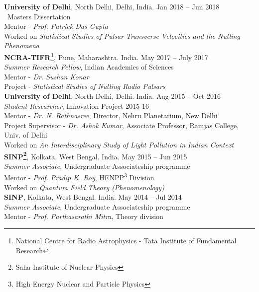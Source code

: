 {\bf University of Delhi}, North Delhi, Delhi, India. \hfill{Jan 2018 -- Jun 2018}\\
{\ Masters Dissertation}\\
Mentor - {\em Prof. Patrick Das Gupta}\\
Worked on {\em Statistical Studies of Pulsar Transverse Velocities and the Nulling Phenomena}\\

{\bf NCRA-TIFR\footnote{National Centre for Radio Astrophysics - Tata Institute of Fundamental Research}}, Pune, Maharashtra. India. \hfill{May 2017 -- July 2017}\\
{\em Summer Research Fellow}, Indian Academies of Sciences\\
Mentor - {\em Dr. Sushan Konar}\\
Project - {\em Statistical Studies of Nulling Radio Pulsars}\\

{\bf University of Delhi}, North Delhi, Delhi. India. \hfill{Aug 2015 -- Oct 2016}\\
{\em Student Researcher}, Innovation Project 2015-16\\
Mentor - {\em Dr. N. Rathnasree}, Director, Nehru Planetarium, New Delhi\\
Project Supervisor - {\em Dr. Ashok Kumar}, Associate Professor, Ramjas College, Univ. of Delhi\\
Worked on {\em An Interdisciplinary Study of Light Pollution in Indian Context}\\

{\bf SINP\footnote{Saha Institute of Nuclear Physics}}, Kolkata, West Bengal. India. \hfill{May 2015 -- Jun 2015}\\
{\em Summer Associate}, Undergraduate Associateship programme\\
Mentor - {\em Prof. Pradip K. Roy}, HENPP\footnote{High Energy Nuclear and Particle Physics} Division\\
Worked on  {\em Quantum Field Theory (Phenomenology)}\\

{\bf SINP}, Kolkata, West Bengal. India. \hfill{May 2014 -- Jul 2014}\\
{\em Summer Associate}, Undergraduate Associateship programme\\
Mentor - {\em Prof. Parthasarathi Mitra}, Theory division\\